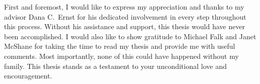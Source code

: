 \begin{acknowledgements}

First and foremost, I would like to express my appreciation and thanks to my advisor Dana C.~Ernst for his dedicated involvement in every step throughout this process. Without his assistance and support, this thesis would have never been accomplished. I would also like to show gratitude to Michael Falk and Janet McShane for taking the time to read my thesis and provide me with useful comments. Most importantly, none of this could have happened without my family. This thesis stands as a testament to your unconditional love and encouragement.
\end{acknowledgements}